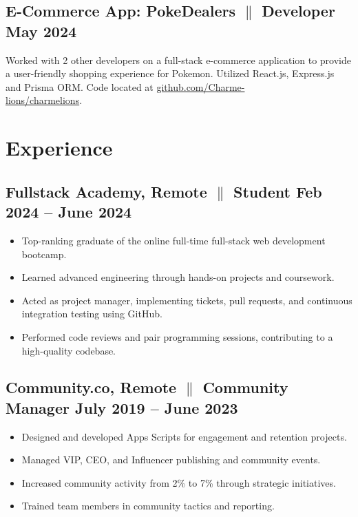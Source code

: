\documentclass[a4paper,10pt]{article}
\begin{document}
\subsection{E-Commerce App: PokeDealers {$\parallel$}{ Developer}
\hfill \textbf{May 2024}}
{Worked with 2 other developers on a full-stack e-commerce application to provide a user-friendly shopping experience for Pokemon. Utilized React.js, Express.js and Prisma ORM. Code located
      at \href{https://github.com/Charmelions/charmelions}{github.com/Charme- \\ lions/charmelions}.}

\section{Experience}

\subsection{Fullstack Academy, Remote {$\parallel$}{ Student} \hfill
      \textbf{Feb
            2024 – June
            2024}}
\begin{itemize}
      \item Top-ranking graduate of the online full-time full-stack web
            development
            bootcamp.
      \item Learned advanced engineering through
            hands-on
            projects and coursework.
      \item Acted as project manager, implementing tickets, pull requests, and
            continuous integration testing using GitHub.
      \item Performed code reviews and pair programming sessions, contributing
            to a high-quality codebase.
\end{itemize}

\subsection{Community.co, Remote {$\parallel$}{ Community Manager} \hfill
      \textbf{July 2019 – June
            2023}}
\begin{itemize}
      \item Designed and developed Apps Scripts for engagement and retention
            projects.
      \item Managed VIP, CEO, and Influencer publishing and community
            events.
      \item Increased community activity from 2\% to 7\% through
            strategic
            initiatives.
      \item Trained team members in community tactics and reporting.
\end{itemize}
\end{document}
